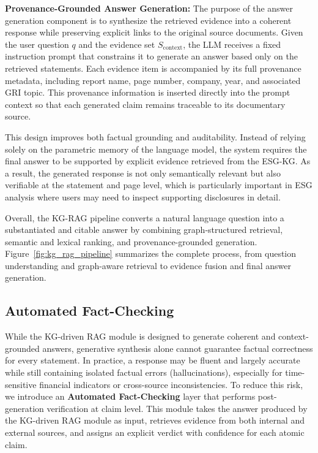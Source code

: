 \documentclass[sn-mathphys, oneside]{sn-jnl}
\begin{document}
\textbf{Provenance-Grounded Answer Generation:}\label{subsubsec:answer_gen} The purpose of the answer generation component is to synthesize the retrieved evidence
into a coherent response while preserving explicit links to the original source
documents. Given the user question $q$ and the evidence set $S_{\text{context}}$,
the LLM receives a fixed instruction prompt that constrains it to generate an answer
based only on the retrieved statements. Each evidence item is accompanied by its full
provenance metadata, including report name, page number, company, year, and associated
GRI topic. This provenance information is inserted directly into the prompt context so
that each generated claim remains traceable to its documentary source.

This design improves both factual grounding and auditability. Instead of relying solely
on the parametric memory of the language model, the system requires the final answer to
be supported by explicit evidence retrieved from the ESG-KG. As a result, the generated
response is not only semantically relevant but also verifiable at the statement and
page level, which is particularly important in ESG analysis where users may need to
inspect supporting disclosures in detail.

Overall, the KG-RAG pipeline converts a natural language question into a substantiated
and citable answer by combining graph-structured retrieval, semantic and lexical ranking,
and provenance-grounded generation. Figure~\ref{fig:kg_rag_pipeline} summarizes the
complete process, from question understanding and graph-aware retrieval to evidence
fusion and final answer generation.

\subsection {Automated Fact-Checking}
\label{subsec:fact-checking}
While the KG-driven RAG module is designed to generate coherent and context-grounded
answers, generative synthesis alone cannot guarantee factual correctness for every
statement. In practice, a response may be fluent and largely accurate while still
containing isolated factual errors (hallucinations), especially for time-sensitive
financial indicators or cross-source inconsistencies. To reduce this risk, we introduce
an \textbf{Automated Fact-Checking} layer that performs post-generation
verification at claim level. This module takes the answer produced by the KG-driven RAG module as input,
retrieves evidence from both internal and external sources, and assigns an explicit
verdict with confidence for each atomic claim.
\end{document}
